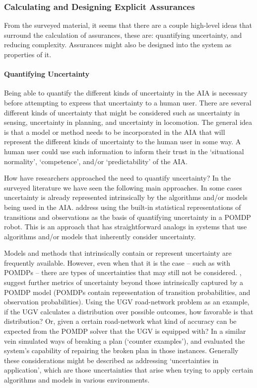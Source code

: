     \subsubsection{Calculating and Designing Explicit Assurances}
    From the surveyed material, it seems that there are a couple high-level ideas that surround the calculation of assurances, these are: quantifying uncertainty, and reducing complexity. Assurances might also be designed into the system as properties of it.

    \paragraph{Quantifying Uncertainty} Being able to quantify the different kinds of uncertainty in the AIA is necessary before attempting to express that uncertainty to a human user. There are several different kinds of uncertainty that might be considered such as uncertainty in sensing, uncertainty in planning, and uncertainty in locomotion. The general idea is that a model or method needs to be incorporated in the AIA that will represent the different kinds of uncertainty to the human user in some way. A human user could use such information to inform their trust in the `situational normality', `competence', and/or `predictability' of the AIA. 

    How have researchers approached the need to quantify uncertainty? In the surveyed literature we have seen the following main approaches. In some cases uncertainty is already represented intrinsically by the algorithms and/or models being used in the AIA. \cite{Wang2016-id} address using the built-in statistical representations of transitions and observations as the basis of quantifying uncertainty in a POMDP robot. This is an approach that has straightforward analogs in systems that use algorithms and/or models that inherently consider uncertainty.

    Models and methods that intrinsically contain or represent uncertainty are frequently available. However, even when that it is the case -- such as with POMDPs -- there are types of uncertainties that may still not be considered. \cite{Aitken2016-fb}, suggest further metrics of uncertainty beyond those intrinsically captured by a POMDP model (POMDPs contain representation of transition probabilities, and observation probabilities). Using the UGV road-network problem as an example, if the UGV calculates a distribution over possible outcomes, how favorable is that distribution? Or, given a certain road-network what kind of accuracy can be expected from the POMDP solver that the UGV is equipped with? In a similar vein \cite{Kuter2012-bv} simulated ways of breaking a plan (`counter examples'), and evaluated the system's capability of repairing the broken plan in those instances. Generally these considerations might be described as addressing `uncertainties in application', which are those uncertainties that arise when trying to apply certain algorithms and models in various environments.

